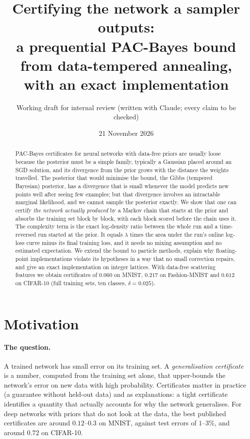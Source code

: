 \documentclass[11pt]{article}
\title{Certifying the network a sampler outputs:\\ a prequential PAC-Bayes bound from data-tempered annealing,\\ with an exact implementation}
\author{Working draft for internal review (written with Claude; every claim to be checked)}
\date{21 November 2026}
\theoremstyle{definition}
\theoremstyle{remark}
\begin{document}
\maketitle

\begin{abstract}
PAC-Bayes certificates for neural networks with data-free priors are usually loose because the posterior must be a
simple family, typically a Gaussian placed around an SGD solution, and its divergence from the prior grows with the
distance the weights travelled. The posterior that would minimise the bound, the Gibbs (tempered Bayesian) posterior,
has a divergence that is small whenever the model predicts new points well after seeing few examples; but that
divergence involves an intractable marginal likelihood, and we cannot sample the posterior exactly. We show that one
can certify \emph{the network actually produced} by a Markov chain that starts at the prior and absorbs the training set
block by block, with each block scored before the chain uses it. The complexity term is the exact log-density ratio
between the whole run and a time-reversed run started at the prior. It equals $\lambda$ times the area under the run's
online log-loss curve minus its final training loss, and it needs no mixing assumption and no estimated expectation.
We extend the bound to particle methods, explain why floating-point implementations violate its hypotheses in a way
that no small correction repairs, and give an exact implementation on integer lattices. With data-free scattering
features we obtain certificates of $0.060$ on MNIST, $0.217$ on Fashion-MNIST and $0.612$ on CIFAR-10 (full training
sets, ten classes, $\delta=0.025$).
\end{abstract}

\tableofcontents
\newpage

\section{Motivation}\label{sec:motivation}

\paragraph{The question.} A trained network has small error on its training set. A \emph{generalisation certificate}
is a number, computed from the training set alone, that upper-bounds the network's error on new data with high
probability. Certificates matter in practice (a guarantee without held-out data) and as explanations: a tight
certificate identifies a quantity that actually accounts for why the network generalises. For deep networks with priors
that do not look at the data, the best published certificates are around $0.12$--$0.3$ on MNIST, against test errors of
$1$--$3\%$, and around $0.72$ on CIFAR-10.
\end{document}
